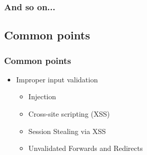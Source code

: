 
\begin{frame}
\frametitle{And so on...}
\end{frame}

\subsection{Common points}


\begin{frame}[t]
\vspace{2em}
\frametitle{Common points}
\begin{itemize}
\pause
\item Improper input validation
	\pause
	\begin{itemize}
		\item<+-> Injection
		\item<+-> Cross-site scripting (XSS)
		\item<+-> Session Stealing via XSS
		\item<+-> Unvalidated Forwards and Redirects
	\end{itemize}
\end{itemize}
\end{frame}

